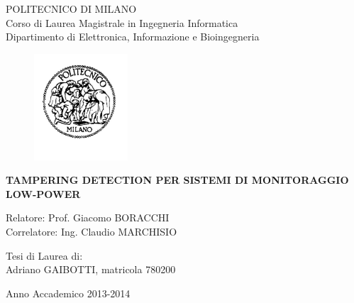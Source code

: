 \thispagestyle{empty}
\vspace*{-1.5cm} \bfseries{
\begin{center}
  \large
  POLITECNICO DI MILANO\\
  \normalsize
  Corso di Laurea Magistrale in Ingegneria Informatica\\
  Dipartimento di Elettronica, Informazione e Bioingegneria\\
  \begin{figure}[htbp]
    \begin{center}
      \includegraphics[width=3.5cm]{./pictures/logopm}
    \end{center}
  \end{figure}
  \vspace*{0.3cm} \LARGE



  \textbf{TAMPERING DETECTION PER SISTEMI DI MONITORAGGIO LOW-POWER}\\



\end{center}
\vspace*{3.0cm} \large
\begin{flushleft}


	Relatore: Prof. Giacomo BORACCHI \\
	Correlatore: Ing. Claudio MARCHISIO\\

  

\end{flushleft}
\vspace*{1.0cm}
\begin{flushright}


  Tesi di Laurea di:\\ Adriano GAIBOTTI, matricola 780200 \\ 
		       


\end{flushright}
\vspace*{0.5cm}
\begin{center}



  Anno Accademico 2013-2014
\end{center} \clearpage
}
